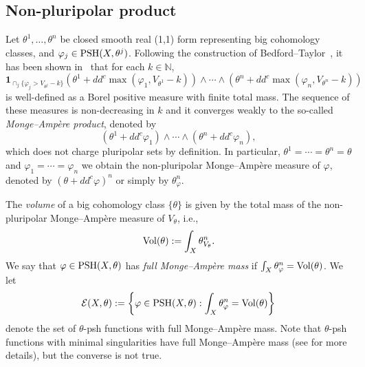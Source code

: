 \documentclass[a4paper,11pt]{amsart}
\numberwithin{equation}{section}
\newtheorem{corollary}[theorem]{Corollary}
\theoremstyle{definition}
\newcommand{\Vol}{{\rm Vol}}
\newcommand{\ddc}{dd^c}
\newcommand{\PSH}{{\rm PSH}}
\begin{document}

\subsection{Non-pluripolar product}


Let $\theta^1,\ldots,\theta^n$ be closed smooth real (1,1) form representing big cohomology classes, and $\varphi_j\in\PSH(X,\theta^j)$. Following the construction of Bedford--Taylor~\cite{bedford1987fine}, it has been shown in~\cite{boucksom2010monge} that for each $k\in\mathbb{N}$,
\[ \mathbf{1}_{\cap_j\{\varphi_j>V_{\theta^j}-k\}}(\theta^1+\ddc{\max(\varphi_1,V_{\theta^1}-k)})\wedge\cdots\wedge (\theta^n+\ddc{\max(\varphi_n, V_{\theta^n}-k)})\] is well-defined as a  Borel positive measure with finite total mass. The sequence of these measures is non-decreasing in $k$ and it converges weakly to the so-called {\em Monge--Amp\`ere product}, denoted by \[ (\theta^1+\ddc{\varphi_1})\wedge \cdots\wedge (\theta^n+\ddc{\varphi_n}),\] 
which does not charge pluripolar sets by definition. In particular, $\theta^1=\cdots=\theta^n=\theta$ and $\varphi_1=\cdots=\varphi_n$ we obtain the non-pluripolar
Monge--Amp\`ere measure of $\varphi$, denoted by $(\theta+\ddc\varphi)^n$ or simply by $\theta_\varphi^n$.

The {\em volume} of a big cohomology class $\{\theta\}$ is given by the total mass of the non-pluripolar Monge--Ampère
measure of $V_\theta$, i.e.,  $${\rm \Vol}(\theta):=\int_{X}\theta_{V_\theta}^n.$$
  We say that $\varphi\in\PSH(X,\theta)$ has {\it full Monge--Amp\`ere mass} if $\int_X\theta_{\varphi}^n=\Vol(\theta)$. We let \begin{align*}
      \mathcal{E}(X,\theta):=\left\{\varphi\in\PSH(X,\theta):\int_X\theta_{\varphi}^n=\Vol(\theta) \right\}
  \end{align*}
  denote the set of $\theta$-psh functions with full Monge--Amp\`ere mass.
  Note that $\theta$-psh functions with minimal singularities have full  Monge--Amp\`ere mass (see \cite[Theorem 1.16]{boucksom2010monge} for more details), but the converse is not true. 
\end{document}
